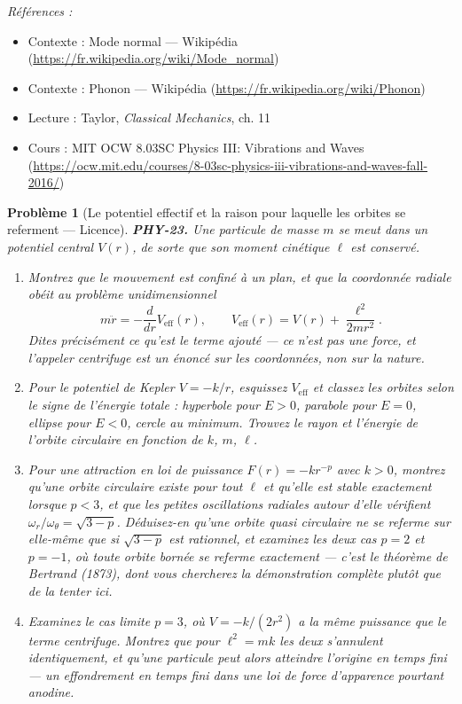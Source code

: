 \documentclass[11pt]{article}
\newtheorem{problem}{Problème}
\newenvironment{refs}{\par\small\noindent\emph{Références :}\begin{itemize}\setlength\itemsep{0pt}}{\end{itemize}\normalsize}
\begin{document}
\begin{refs}
\item Contexte : Mode normal --- Wikipédia (\url{https://fr.wikipedia.org/wiki/Mode_normal})
\item Contexte : Phonon --- Wikipédia (\url{https://fr.wikipedia.org/wiki/Phonon})
\item Lecture : Taylor, \textit{Classical Mechanics}, ch. 11
\item Cours : MIT OCW 8.03SC Physics III: Vibrations and Waves (\url{https://ocw.mit.edu/courses/8-03sc-physics-iii-vibrations-and-waves-fall-2016/})
\end{refs}

\bigskip

\begin{problem}[{Le potentiel effectif et la raison pour laquelle les orbites se referment --- Licence}]
\textbf{PHY-23.} Une particule de masse $m$ se meut dans un potentiel central $V(r)$, de
sorte que son moment cinétique $\ell$ est conservé.
\begin{enumerate}
\item[(a)] Montrez que le mouvement est confiné à un plan, et que la coordonnée radiale obéit au
problème unidimensionnel
\[ m\ddot{r} = -\frac{d}{dr}V_{\text{eff}}(r), \qquad
V_{\text{eff}}(r) = V(r) + \frac{\ell^2}{2mr^2}. \]
Dites précisément ce qu'est le terme ajouté --- ce n'est pas une force, et l'appeler
\og{} centrifuge \fg{} est un énoncé sur les coordonnées, non sur la nature.
\item[(b)] Pour le potentiel de Kepler $V = -k/r$, esquissez $V_{\text{eff}}$ et classez les orbites
selon le signe de l'énergie totale : hyperbole pour $E > 0$, parabole pour $E = 0$, ellipse
pour $E < 0$, cercle au minimum. Trouvez le rayon et l'énergie de l'orbite circulaire en
fonction de $k$, $m$, $\ell$.
\item[(c)] Pour une attraction en loi de puissance $F(r) = -k r^{-p}$ avec $k > 0$, montrez qu'une
orbite circulaire existe pour tout $\ell$ et qu'elle est stable exactement lorsque $p < 3$,
et que les petites oscillations radiales autour d'elle vérifient
$\omega_r/\omega_\theta = \sqrt{3-p}$. Déduisez-en qu'une orbite quasi circulaire ne se referme
sur elle-même que si $\sqrt{3-p}$ est rationnel, et examinez les deux cas $p = 2$ et
$p = -1$, où toute orbite bornée se referme exactement --- c'est le théorème de Bertrand (1873),
dont vous chercherez la démonstration complète plutôt que de la tenter ici.
\item[(d)] Examinez le cas limite $p = 3$, où $V = -k/(2r^2)$ a la même puissance que le terme
centrifuge. Montrez que pour $\ell^2 = mk$ les deux s'annulent identiquement, et qu'une
particule peut alors atteindre l'origine en temps fini --- un effondrement en temps fini dans une
loi de force d'apparence pourtant anodine.
\end{enumerate}

\end{problem}
\end{document}
